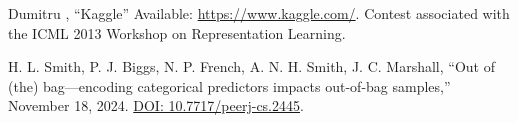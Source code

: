 \documentclass[conference]{IEEEtran}
\begin{document}
\begin{thebibliography}{00}
 Dumitru , ``Kaggle'' Available:  \href{https://www.kaggle.com/c/challenges-in-representation-learning-facial-expression-recognition-challenge/overview}{https://www.kaggle.com/}. Contest associated with the ICML 2013 Workshop on Representation Learning.

 H. L. Smith, P. J. Biggs, N. P. French, A. N. H. Smith, J. C. Marshall, ``Out of (the) bag—encoding categorical predictors impacts out-of-bag samples,'' November 18, 2024. \href{https://doi.org/10.7717/peerj-cs.2445}{DOI: 10.7717/peerj-cs.2445}.


\end{thebibliography}
\end{document}
